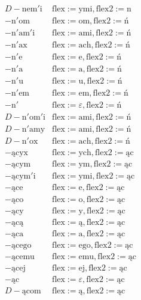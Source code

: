 \documentclass{article}
\begin{document}
\begin{scriptsize}
\[\begin{array}{ll}
D-\text{nem$'$i} & \text{flex}:=\text{ymi}, \text{flex2}:=\text{n}\\
-\text{n$'$om} & \text{flex}:=\text{om}, \text{flex2}:=\text{ń}\\
-\text{n$'$am$'$i} & \text{flex}:=\text{ami}, \text{flex2}:=\text{ń}\\
-\text{n$'$ax} & \text{flex}:=\text{ach}, \text{flex2}:=\text{ń}\\
-\text{n$'$e} & \text{flex}:=\text{e}, \text{flex2}:=\text{ń}\\
-\text{n$'$a} & \text{flex}:=\text{a}, \text{flex2}:=\text{ń}\\
-\text{n$'$u} & \text{flex}:=\text{u}, \text{flex2}:=\text{ń}\\
-\text{n$'$em} & \text{flex}:=\text{em}, \text{flex2}:=\text{ń}\\
-\text{n$'$} & \text{flex}:=\text{$\varepsilon$}, \text{flex2}:=\text{ń}\\
D-\text{n$'$om$'$i} & \text{flex}:=\text{ami}, \text{flex2}:=\text{ń}\\
D-\text{n$'$amy} & \text{flex}:=\text{ami}, \text{flex2}:=\text{ń}\\
D-\text{n$'$ox} & \text{flex}:=\text{ach}, \text{flex2}:=\text{ń}\\
-\text{ącyx} & \text{flex}:=\text{ych}, \text{flex2}:=\text{ąc}\\
-\text{ącym} & \text{flex}:=\text{ym}, \text{flex2}:=\text{ąc}\\
-\text{ącym$'$i} & \text{flex}:=\text{ymi}, \text{flex2}:=\text{ąc}\\
-\text{ące} & \text{flex}:=\text{e}, \text{flex2}:=\text{ąc}\\
-\text{ąco} & \text{flex}:=\text{o}, \text{flex2}:=\text{ąc}\\
-\text{ący} & \text{flex}:=\text{y}, \text{flex2}:=\text{ąc}\\
-\text{ącą} & \text{flex}:=\text{ą}, \text{flex2}:=\text{ąc}\\
-\text{ąca} & \text{flex}:=\text{a}, \text{flex2}:=\text{ąc}\\
-\text{ącego} & \text{flex}:=\text{ego}, \text{flex2}:=\text{ąc}\\
-\text{ącemu} & \text{flex}:=\text{emu}, \text{flex2}:=\text{ąc}\\
-\text{ącej} & \text{flex}:=\text{ej}, \text{flex2}:=\text{ąc}\\
-\text{ąc} & \text{flex}:=\text{$\varepsilon$}, \text{flex2}:=\text{ąc}\\
D-\text{ącom} & \text{flex}:=\text{ą}, \text{flex2}:=\text{ąc}\\

\end{array}\]
\end{scriptsize}
\end{document}
